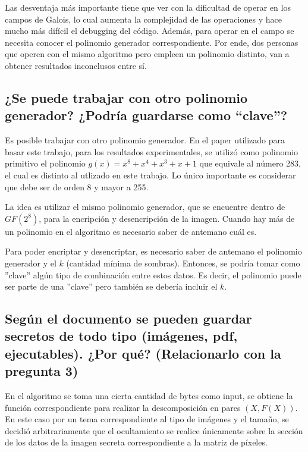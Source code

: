 \documentclass[11pt]{scrartcl} %
\begin{document}
Las desventaja más importante tiene que ver con la dificultad de operar en los campos de Galois, lo cual aumenta la complejidad de las operaciones y hace mucho más difícil el debugging del código. Además, para operar en el campo se necesita conocer el polinomio generador correspondiente. Por ende, dos personas que operen con el mismo algoritmo pero empleen un polinomio distinto, van a obtener resultados inconclusos entre sí.


\subsection{¿Se puede trabajar con otro polinomio generador? ¿Podría guardarse como “clave”?}

Es posible trabajar con otro polinomio generador. En el paper utilizado para basar este trabajo, para los resultados experimentales, se utilizó como polinomio primitivo el polinomio 
$g(x) = x^8 + x^4 + x^3 + x + 1$ que equivale al número 283, el cual es distinto al utlizado en este trabajo. Lo único importante es considerar que debe ser de orden 8 y mayor a 255.

La idea es utilizar el mismo polinomio generador, que se encuentre dentro de $GF(2^8)$, para la encripción y desencripción de la imagen. Cuando hay más de un polinomio en el algoritmo es necesario saber de antemano cuál es.

Para poder encriptar y desencriptar, es necesario saber de antemano el polinomio generador y el $k$ (cantidad mínima de sombras). Entonces, se podría tomar como ''clave'' algún tipo de combinación entre estos datos. Es decir, el polinomio puede ser parte de una ''clave'' pero también se debería incluir el $k$.


\subsection{Según el documento se pueden guardar secretos de todo tipo (imágenes, pdf, ejecutables). ¿Por qué? (Relacionarlo con la pregunta 3)}

En el algoritmo se toma una cierta cantidad de bytes como input, se obtiene la función correspondiente para realizar la descomposición en pares $(X, F(X))$. En este caso por un tema correspondiente al tipo de imágenes y el tamaño, se decidió arbitrariamente que el ocultamiento se realice únicamente sobre la sección de los datos de la imagen secreta correspondiente a la matriz de píxeles.
\end{document}
